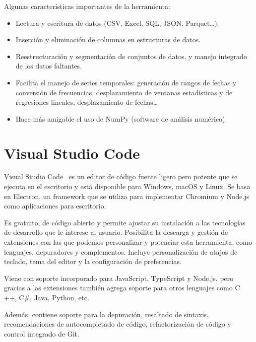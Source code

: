 \documentclass[a4paper, 12pt]{book}
\begin{document}
\vspace{5mm}
Algunas características importantes de la herramienta:
\begin{itemize}
    \item Lectura y escritura de datos (CSV, Excel, SQL, JSON, Parquet…).
    \item Inserción y eliminación de columnas en estructuras de datos.
    \item Reestructuración y segmentación de conjuntos de datos, y manejo integrado de los datos faltantes.
    \item Facilita el manejo de series temporales: generación de rangos de fechas y conversión de frecuencias, desplazamiento de ventanas estadísticas y de regresiones lineales, desplazamiento de fechas…
    \item Hace más amigable el uso de NumPy (software de análisis numérico).
\end{itemize}

\section{Visual Studio Code} 
\label{sec:visual-studio-code}

Visual Studio Code~\cite{visualstudio} es un editor de código fuente ligero pero potente que se ejecuta en el escritorio y está disponible para Windows, macOS y Linux.
Se basa en Electron, un framework que se utiliza para implementar Chromium y Node.js como aplicaciones para escritorio.

\vspace{5mm}
Es gratuito, de código abierto y permite ajustar su instalación a las tecnologías de desarrollo que le interese al usuario.
Posibilita la descarga y gestión de extensiones con las que podemos personalizar y potenciar esta herramienta, como lenguajes, depuradores y complementos.
Incluye personalización de atajos de teclado, tema del editor y la configuración de preferencias.

\vspace{5mm}
Viene con soporte incorporado para JavaScript, TypeScript y Node.js, pero gracias a las extensiones también agrega soporte para otros lenguajes como C ++, C\#, Java, Python, etc.

\vspace{5mm}
Además, contiene soporte para la depuración, resaltado de sintaxis, recomendaciones de autocompletado de código, refactorización de código y control integrado de Git.
\end{document}
